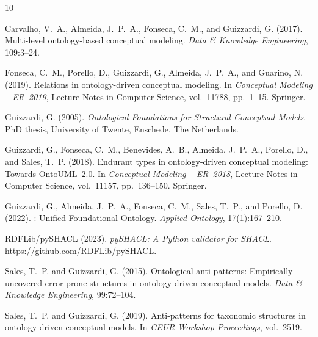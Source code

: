 \documentclass[12pt,a4paper]{article}
\begin{document}
\begin{thebibliography}{10}

Carvalho, V.~A., Almeida, J.~P.~A., Fonseca, C.~M., and Guizzardi, G. (2017).
\newblock Multi-level ontology-based conceptual modeling.
\newblock \emph{Data \& Knowledge Engineering}, 109:3--24.

Fonseca, C.~M., Porello, D., Guizzardi, G., Almeida, J.~P.~A., and
  Guarino, N. (2019).
\newblock Relations in ontology-driven conceptual modeling.
\newblock In \emph{Conceptual Modeling -- ER~2019}, Lecture Notes in Computer
  Science, vol.~11788, pp.~1--15. Springer.

Guizzardi, G. (2005).
\newblock \emph{Ontological Foundations for Structural Conceptual Models}.
\newblock PhD thesis, University of Twente, Enschede, The Netherlands.

Guizzardi, G., Fonseca, C.~M., Benevides, A.~B., Almeida, J.~P.~A., Porello,
  D., and Sales, T.~P. (2018).
\newblock Endurant types in ontology-driven conceptual modeling: Towards
  OntoUML~2.0.
\newblock In \emph{Conceptual Modeling -- ER~2018}, Lecture Notes in Computer
  Science, vol.~11157, pp.~136--150. Springer.

Guizzardi, G., Almeida, J.~P.~A., Fonseca, C.~M., Sales, T.~P., and
  Porello, D. (2022).
: Unified Foundational Ontology.
\newblock \emph{Applied Ontology}, 17(1):167--210.

RDFLib/pySHACL (2023).
\newblock \emph{pySHACL: A Python validator for SHACL}.
\newblock \url{https://github.com/RDFLib/pySHACL}.

Sales, T.~P. and Guizzardi, G. (2015).
\newblock Ontological anti-patterns: Empirically uncovered error-prone
  structures in ontology-driven conceptual models.
\newblock \emph{Data \& Knowledge Engineering}, 99:72--104.

Sales, T.~P. and Guizzardi, G. (2019).
\newblock Anti-patterns for taxonomic structures in ontology-driven conceptual
  models.
\newblock In \emph{CEUR Workshop Proceedings}, vol.~2519.

\end{thebibliography}
\end{document}
